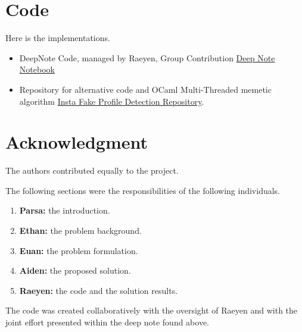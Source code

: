 \documentclass[conference]{IEEEtran}
\begin{document}


\appendix

\section{Code}

Here is the implementations.

\begin{itemize}
	\item DeepNote Code, managed by Raeyen, Group Contribution \href{https://deepnote.com/workspace/yes-c049-5ed54f34-9a07-49d4-91a2-b1419cbace6e/project/Raeyen-Nuttalls-Untitled-project-15377316-ffd4-45cc-9912-cba9081d5b2e/notebook/Memetic%20Algorithm-412d34e5cc8042b893fdd10bccc6b6c3}{Deep Note Notebook}
	\item Repository for alternative code and OCaml Multi-Threaded memetic algorithm \href{https://github.com/UTS-Projects-2021-2025/insta-fake-profile-detection}{Insta Fake Profile Detection Repository}.
\end{itemize}

\section*{Acknowledgment}

The authors contributed equally to the project.

The following sections were the responsibilities of the following individuals.

\begin{enumerate}
	\item \textbf{Parsa:} the introduction.
	\item \textbf{Ethan:} the problem background.
	\item \textbf{Euan:} the problem formulation.
	\item \textbf{Aiden:} the proposed solution.
	\item \textbf{Raeyen:} the code and the solution results.
\end{enumerate}

The code was created collaboratively with the oversight of Raeyen and with the joint effort presented within the deep note found above.


\newpage
\printbibliography



\end{document}
